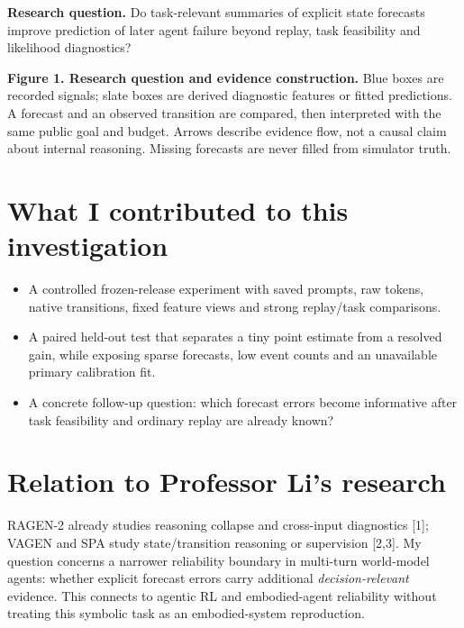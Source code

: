 \documentclass[10pt,a4paper]{article}
\newcommand{\captiontext}[1]{{\fontsize{8.8}{10.6}\selectfont\color{slate}#1\par}}
\begin{document}
\textbf{Research question.} Do task-relevant summaries of explicit state forecasts improve prediction of later agent failure beyond replay, task feasibility and likelihood diagnostics?

\vspace{3pt}
\begin{center}\end{center}
\captiontext{\textbf{Figure 1. Research question and evidence construction.} Blue boxes are recorded signals; slate boxes are derived diagnostic features or fitted predictions. A forecast and an observed transition are compared, then interpreted with the same public goal and budget. Arrows describe evidence flow, not a causal claim about internal reasoning. Missing forecasts are never filled from simulator truth.}

\section{What I contributed to this investigation}
\begin{itemize}
\item A controlled frozen-release experiment with saved prompts, raw tokens, native transitions, fixed feature views and strong replay/task comparisons.
\item A paired held-out test that separates a tiny point estimate from a resolved gain, while exposing sparse forecasts, low event counts and an unavailable primary calibration fit.
\item A concrete follow-up question: which forecast errors become informative after task feasibility and ordinary replay are already known?
\end{itemize}

\section{Relation to Professor Li's research}
RAGEN-2 already studies reasoning collapse and cross-input diagnostics [1]; VAGEN and SPA study state/transition reasoning or supervision [2,3]. My question concerns a narrower reliability boundary in multi-turn world-model agents: whether explicit forecast errors carry additional \emph{decision-relevant} evidence. This connects to agentic RL and embodied-agent reliability without treating this symbolic task as an embodied-system reproduction.
\end{document}
